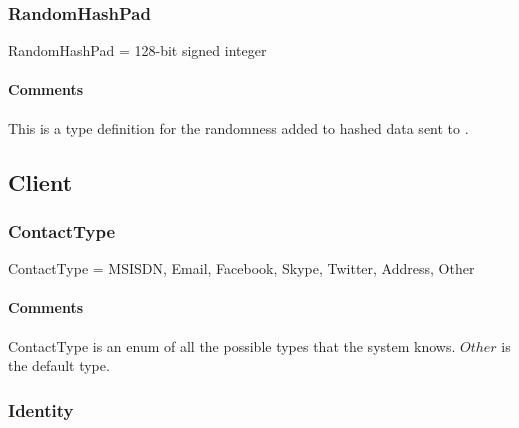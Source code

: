 \documentclass[a4paper,10pt]{article}
\begin{document}
\subsubsection{RandomHashPad}

\begin{verbbox}
RandomHashPad = 128-bit signed integer
\end{verbbox}
\begin{center}
\theverbbox
\end{center}

\begin{inparaitem}[ ]
 \item \infrastructure
\end{inparaitem}

\paragraph*{Comments}
This is a type definition for the randomness added to hashed data sent to \Server{}.

\subsection{Client}
\label{sec:structure:client}

\subsubsection{ContactType}
\begin{verbbox}
ContactType = { MSISDN, Email, Facebook, Skype, Twitter, Address,
                Other }
\end{verbbox}
\begin{center}
\theverbbox
\end{center}

\begin{inparaitem}[ ]
 \item \infrastructure
\end{inparaitem}

\paragraph*{Comments}
ContactType is an enum of all the possible types that the system knows. $Other$ is the default type.

\subsubsection{Identity}
\end{document}
